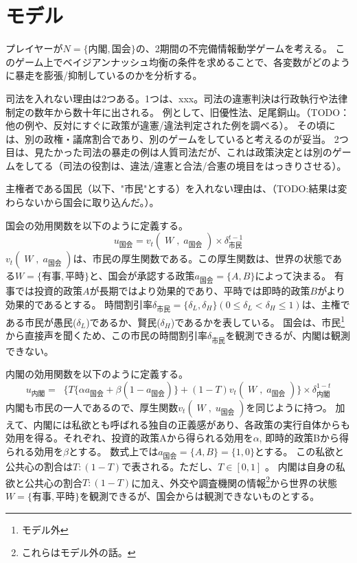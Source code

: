 \documentclass[main.tex]{subfiles}
\begin{document}
\section{モデル}

プレイヤーが$N=\lbrace 内閣, 国会 \rbrace$の、2期間の不完備情報動学ゲームを考える。
このゲーム上でベイジアンナッシュ均衡の条件を求めることで、各変数がどのように暴走を膨張/抑制しているのかを分析する。



司法を入れない理由は2つある。1つは、xxx。司法の違憲判決は行政執行や法律制定の数年から数十年に出される。
例として、旧優性法、足尾銅山。（TODO：他の例や、反対にすぐに政策が違憲/違法判定された例を調べる）。
その頃には、別の政権・議席割合であり、別のゲームをしていると考えるのが妥当。
2つ目は、見たかった司法の暴走の例は人質司法だが、これは政策決定とは別のゲームをしてる（司法の役割は、違法/違憲と合法/合憲の境目をはっきりさせる）。

主権者である国民（以下、"市民"とする）を入れない理由は、（TODO:結果は変わらないから国会に取り込んだ。）。


国会の効用関数を以下のように定義する。
$$u_\text{国会} = v_t(\;W\;,\; a_\text{国会}\;) × \delta^{t-1}_\text{市民}$$
$v_t(\;W\;,\; a_\text{国会}\;)$は、市民の厚生関数である。この厚生関数は、世界の状態である$W=\lbrace 有事, 平時\rbrace$と、国会が承認する政策$a_{国会}=\lbrace A, B\rbrace$によって決まる。
有事では投資的政策$A$が長期ではより効果的であり、平時では即時的政策$B$がより効果的であるとする。
時間割引率$\delta_{市民}=\lbrace \delta_L, \delta_H \rbrace (0\le \delta_L<\delta_H \le 1)$は、主権である市民が愚民($\delta_L$)であるか、賢民($\delta_H$)であるかを表している。
国会は、市民\footnote{モデル外}から直接声を聞くため、この市民の時間割引率$\delta_{市民}$を観測できるが、内閣は観測できない。

内閣の効用関数を以下のように定義する。
$$ u_\text{内閣} =\;\; \lbrace T\lbrace \alpha a_\text{国会} + \beta (1-a_\text{国会}) \rbrace  + (1-T)v_t(\;W\;,\; a_\text{国会}\;) \rbrace × \delta^{1-t}_{内閣}$$
内閣も市民の一人であるので、厚生関数$v_t(\;W\;,\; u_\text{国会}\;)$を同じように持つ。
加えて、内閣には私欲とも呼ばれる独自の正義感があり、各政策の実行自体からも効用を得る。それぞれ、投資的政策Aから得られる効用を$\alpha$, 即時的政策Bから得られる効用を$\beta$とする。
数式上では$a_{国会}=\lbrace A, B\rbrace = \lbrace 1,0\rbrace$とする。
この私欲と公共心の割合は$T:(1-T)$で表される。ただし、$T\in[0,1]$ 。
内閣は自身の私欲と公共心の割合$T:(1-T)$に加え、外交や調査機関の情報\footnote{これらはモデル外の話。}から世界の状態$W=\lbrace 有事, 平時\rbrace$を観測できるが、国会からは観測できないものとする。
\end{document}
